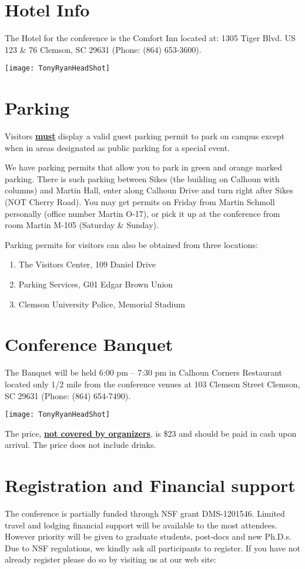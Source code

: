 \documentclass[10pt,foldmark,notumble,draft]{leaflet}
\begin{document}
\section{Hotel Info}
The Hotel for the conference is the Comfort Inn located at:
1305 Tiger Blvd.
US 123 \& 76
Clemson, SC 29631
(Phone: (864) 653-3600).

\texttt{[image: TonyRyanHeadShot]}
\section{Parking}
Visitors \underline{\bf must} display a valid guest parking permit to
park on campus except when in areas designated as public parking for a
special event.


We have parking permits that allow you to park in green and orange
marked parking. There is such parking between Sikes (the building on
Calhoun with columns) and Martin Hall, enter along Calhoun Drive and
turn right after Sikes (NOT Cherry Road). You may get permits on Friday
from Martin Schmoll personally (office number Martin O-17), or pick it
up at the conference from room Martin M-105 (Saturday \& Sunday).


Parking permits for visitors can also be obtained from three locations:
\begin{enumerate}
\item The Visitors Center, 109 Daniel Drive
\item Parking Services, G01 Edgar Brown Union
\item Clemson University Police, Memorial
Stadium
\end{enumerate}
\section{Conference Banquet}
The Banquet will be held 6:00 pm -- 7:30 pm in Calhoun Corners
Restaurant located only 1/2 mile from the conference venues at
103 Clemson Street
Clemson, SC 29631
(Phone: (864) 654-7490).

\texttt{[image: TonyRyanHeadShot]}

The price, \underline{\bf not covered by organizers}, is \$23 and should
be paid in cash upon arrival. The price does not include drinks.



\section{Registration and Financial support} The
conference is partially funded through NSF grant DMS-1201546.  Limited
travel and lodging financial support will be available to the most
attendees. However priority will be given to graduate students,
post-docs and new Ph.D.s. Due to NSF regulations, we kindly ask all
participants to register. If you have not already register please do so
by visiting us at our web site:
\end{document}

